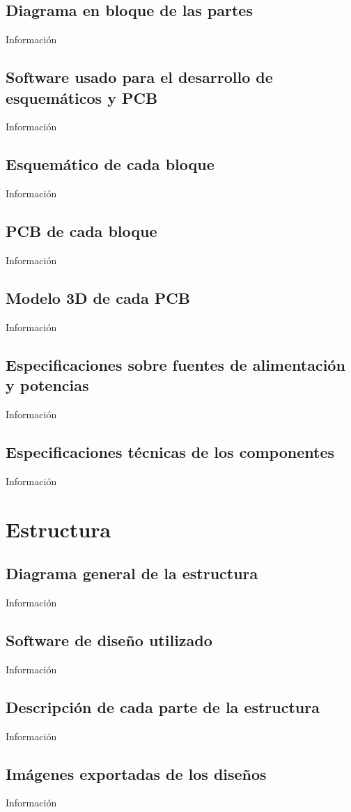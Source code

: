 \documentclass[a4paper,12pt]{report}
\begin{document}
\section{Diagrama en bloque de las partes}
Información

\section{Software usado para el desarrollo de esquemáticos y PCB}
Información

\section{Esquemático de cada bloque}
Información

\section{PCB de cada bloque}
Información

\section{Modelo 3D de cada PCB}
Información

\section{Especificaciones sobre fuentes de alimentación y potencias}
Información

\section{Especificaciones técnicas de los componentes}
Información

\chapter{Estructura}
\section{Diagrama general de la estructura}
Información

\section{Software de diseño utilizado}
Información

\section{Descripción de cada parte de la estructura}
Información

\section{Imágenes exportadas de los diseños}
Información

\begin{appendix}
   
   
\end{appendix}
\end{document}
